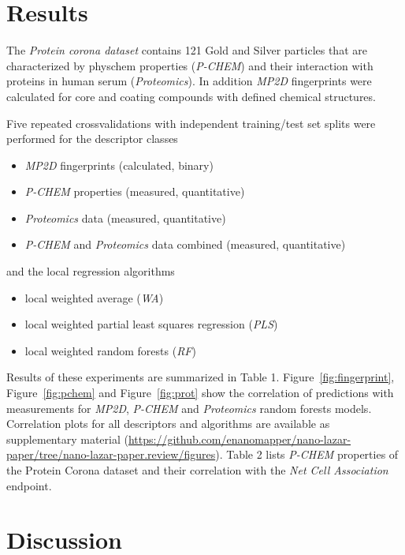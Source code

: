 \documentclass[utf8]{frontiersHLTH} %
\providecommand{\tightlist}{%
  \setlength{\itemsep}{0pt}\setlength{\parskip}{0pt}}
\begin{document}
\section{Results}\label{results}

The \emph{Protein corona dataset} contains 121 Gold and Silver particles
that are characterized by physchem properties (\emph{P-CHEM}) and their
interaction with proteins in human serum (\emph{Proteomics}). In
addition \emph{MP2D} fingerprints were calculated for core and coating
compounds with defined chemical structures.

Five repeated crossvalidations with independent training/test set splits
were performed for the descriptor classes

\begin{itemize}
\tightlist
\item
  \emph{MP2D} fingerprints (calculated, binary)
\item
  \emph{P-CHEM} properties (measured, quantitative)
\item
  \emph{Proteomics} data (measured, quantitative)
\item
  \emph{P-CHEM} and \emph{Proteomics} data combined (measured,
  quantitative)
\end{itemize}

and the local regression algorithms

\begin{itemize}
\tightlist
\item
  local weighted average (\emph{WA})
\item
  local weighted partial least squares regression (\emph{PLS})
\item
  local weighted random forests (\emph{RF})
\end{itemize}

Results of these experiments are summarized in Table 1.
Figure~\ref{fig:fingerprint}, Figure~\ref{fig:pchem} and
Figure~\ref{fig:prot} show the correlation of predictions with
measurements for \emph{MP2D}, \emph{P-CHEM} and \emph{Proteomics} random
forests models. Correlation plots for all descriptors and algorithms are
available as supplementary material
(\url{https://github.com/enanomapper/nano-lazar-paper/tree/nano-lazar-paper.review/figures}).
Table 2 lists \emph{P-CHEM} properties of the Protein Corona dataset and
their correlation with the \emph{Net Cell Association} endpoint.

\section{Discussion}\label{discussion}
\end{document}
